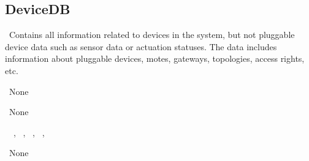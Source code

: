 \subsection{DeviceDB}\label{comp:DeviceDatabaseDeviceDB}
	\begin{description}
		\item[Responsibility:]~Contains all information related to devices in the system, but not pluggable device data such as sensor data or actuation statuses. The data includes information about pluggable devices, motes, gateways, topologies, access rights, etc.
		\item[Super-components:]~None
		\item[Sub-components:]~None
		\item[Provided interfaces:]~\iconprovided{}~, \iconprovided{}~, \iconprovided{}~, \iconprovided{}~, \iconprovided{}~
		\item[Required interfaces:]~None		
	\end{description}
